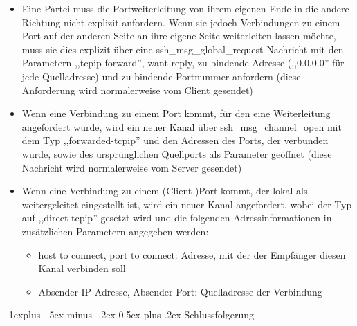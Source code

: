 \documentclass[a4paper]{article}
\makeatletter
\renewcommand{\subsection}{\@startsection{subsection}{2}{0mm}%
 {-1explus -.5ex minus -.2ex}%
 {0.5ex plus .2ex}%
 {\normalfont\normalsize\bfseries}}
\makeatother
\begin{document}
\begin{multicols}{3}
\begin{itemize}
              \begin{itemize}
                  \item
                        Eine Partei muss die Portweiterleitung von ihrem eigenen Ende in die
                        andere Richtung nicht explizit anfordern. Wenn sie jedoch
                        Verbindungen zu einem Port auf der anderen Seite an ihre eigene
                        Seite weiterleiten lassen möchte, muss sie dies explizit über eine
                        ssh\_msg\_global\_request-Nachricht mit den Parametern
                        ,,tcpip-forward'', want-reply, zu bindende Adresse (,,0.0.0.0'' für
                        jede Quelladresse) und zu bindende Portnummer anfordern (diese
                        Anforderung wird normalerweise vom Client gesendet)
                  \item
                        Wenn eine Verbindung zu einem Port kommt, für den eine Weiterleitung
                        angefordert wurde, wird ein neuer Kanal über ssh\_msg\_channel\_open
                        mit dem Typ ,,forwarded-tcpip'' und den Adressen des Ports, der
                        verbunden wurde, sowie des ursprünglichen Quellports als Parameter
                        geöffnet (diese Nachricht wird normalerweise vom Server gesendet)
                  \item
                        Wenn eine Verbindung zu einem (Client-)Port kommt, der lokal als
                        weitergeleitet eingestellt ist, wird ein neuer Kanal angefordert,
                        wobei der Typ auf ,,direct-tcpip'' gesetzt wird und die folgenden
                        Adressinformationen in zusätzlichen Parametern angegeben werden:

                        \begin{itemize}
                            \item
                                  host to connect, port to connect: Adresse, mit der der Empfänger
                                  diesen Kanal verbinden soll
                            \item
                                  Absender-IP-Adresse, Absender-Port: Quelladresse der Verbindung
                        \end{itemize}
              \end{itemize}
    \end{itemize}


    \subsection{Schlussfolgerung}


\end{multicols}
\end{document}
